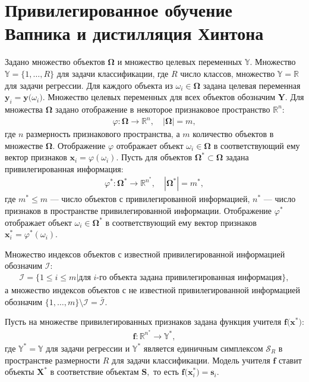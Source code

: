 \section{Привилегированное обучение Вапника и дистилляция Хинтона}

Задано множество объектов $\bm{\Omega}$ и множество целевых переменных $\mathbb{Y}$. Множество $\mathbb{Y}=\{1,\ldots,R\}$ для задачи классификации, где $R$ число классов, множество $\mathbb{Y}=\mathbb{R}$ для задачи регрессии.
Для каждого объекта из $\omega_i \in \bm{\Omega}$ задана целевая переменная $\mathbf{y}_i = \mathbf{y}\bigr(\omega_i\bigr)$. Множество целевых переменных для всех объектов обозначим $\mathbf{Y}$.
Для множества $\bm{\Omega}$ задано отображение в некоторое признаковое пространство $\mathbb{R}^{n}$:
\[
\label{eq:st:phi}
\begin{aligned}
\varphi:\bm{\Omega} \to \mathbb{R}^{n}, \quad \left|\bm{\Omega}\right| = m,
\end{aligned}
\]
где $n$ размерность признакового пространства, а $m$ количество объектов в множестве $\bm{\Omega}$. Отображение $\varphi$ отображает объект $\omega_i \in \bm{\Omega}$ в соответствующий ему вектор признаков $\mathbf{x}_i = \varphi(\omega_i)$.
Пусть для объектов $\bm{\Omega}^* \subset \bm{\Omega}$ задана привилегированная информация:
\[
\label{eq:st:phi*}
\begin{aligned}
\varphi^*:\bm{\Omega}^* \to \mathbb{R}^{n^*}, \quad \left|\bm{\Omega}^*\right| = m^*,
\end{aligned}
\]
где $m^* \leq m$ --- число объектов с привилегированной информацией, $n^*$ --- число признаков в пространстве привилегированной информации. Отображение $\varphi^*$ отображает объект $\omega_i \in \bm{\Omega^*}$ в соответствующий ему вектор признаков $\mathbf{x}^*_i = \varphi^*(\omega_i)$.

Множество индексов объектов с известной привилегированной информацией обозначим $\mathcal{I}$:
\[
\label{eq:st:3}
\begin{aligned}
\mathcal{I} = \{1 \leq i \leq m | \text{для $i$-го объекта задана привилегированная информация}\},
\end{aligned}
\]
а множество индексов объектов с не известной привилегированной информацией обозначим $\{1, \ldots, m\}\setminus \mathcal{I} = \bar{\mathcal{I}}$.

Пусть на множестве привилегированных признаков задана функция учителя $\mathbf{f}\bigr(\mathbf{x}^*\bigr)$:
\[
\begin{aligned}
\mathbf{f}:\mathbb{R}^{n^*} \to \mathbb{Y}^*,
\end{aligned}
\]
где $\mathbb{Y}^*=\mathbb{Y}$ для задачи регрессии и $\mathbb{Y}^*$ является единичным симплексом $\mathcal{S}_R$ в пространстве размерности $R$ для задачи классификации. Модель учителя $\mathbf{f}$ ставит объекты $\mathbf{X}^*$ в соответствие объектам $\mathbf{S},$ то есть  $\mathbf{f}\bigr(\mathbf{x}^*_i\bigr)=\mathbf{s}_i$.

